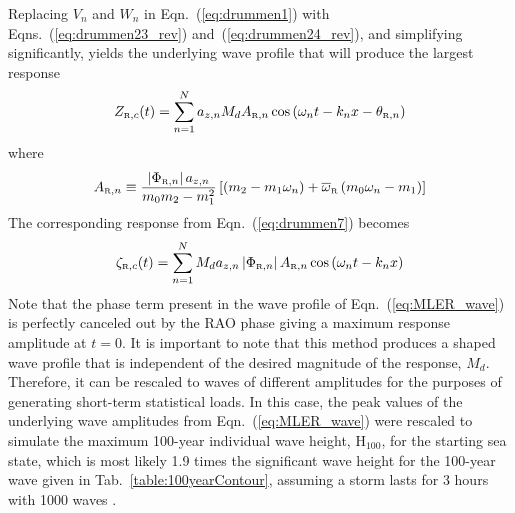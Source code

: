 Replacing $V_n$ and $W_n$ in Eqn.~(\ref{eq:drummen1}) with Eqns.~(\ref{eq:drummen23_rev}) and~(\ref{eq:drummen24_rev}), and simplifying significantly, yields the underlying wave profile that will produce the largest response
\begin{align}
Z_{\text{\tiny{R}},c}(t) = \sum_{n=1}^N a_{z,n}
              M_d A_{\text{\tiny{R}},n} \cos\left(\omega_n t - k_n x - \theta_{\text{\tiny{R}},n}\right)
\label{eq:MLER_wave}
\end{align}
where 
\begin{equation}
A_{\text{\tiny{R}},n} \equiv \frac{\left|\Phi_{\text{\tiny{R}},n}\right| a_{z,n}}{m_0 m_2 - m_1^2} 
   \left[\left( m_2 - m_1 \omega_n \right) + \overline{\omega}_{\text{\tiny{R}}} \left(m_0 \omega_n - m_1 \right)\right]
\label{eq:A_Rn}
\end{equation}
The corresponding response from Eqn.~(\ref{eq:drummen7}) becomes
\begin{equation}
\zeta_{\text{\tiny{R}},c}(t) = \sum_{n=1}^N M_d a_{z,n} \left|\Phi_{\text{\tiny{R}},n}\right| 
                                    A_{\text{\tiny{R}},n} \cos\left(\omega_n t - k_n x\right)
\label{eq:MLER_response}
\end{equation}
Note that the phase term present in the wave profile of Eqn.~(\ref{eq:MLER_wave}) is perfectly canceled out by the RAO phase giving a maximum response amplitude at $t=0$.  It is important to note that this method produces a shaped wave profile that is independent of the desired magnitude of the response, $M_d$. Therefore, it can be rescaled to waves of different amplitudes for the purposes of generating short-term statistical loads.  In this case, the peak values of the underlying wave amplitudes from Eqn.~(\ref{eq:MLER_wave}) were rescaled to simulate the maximum 100-year individual wave height, H$_{100}$, for the starting sea state, which is most likely 1.9 times the significant wave height for the 100-year wave given in Tab.~\ref{table:100yearContour}, assuming a storm lasts for 3 hours with 1000 waves  \cite{DetNorskeVeritas2010a}.


